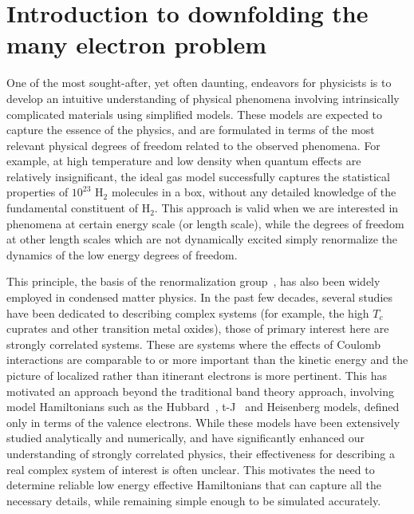 \section{Introduction to downfolding the many electron problem}

One of the most sought-after, yet often daunting, endeavors for physicists is to develop an intuitive understanding of physical phenomena involving intrinsically complicated materials using simplified models. 
These models are expected to capture the essence of the physics, and are formulated in terms of the most relevant physical degrees of freedom related to the observed phenomena. 
For example, at high temperature and low density when quantum effects are relatively insignificant, the ideal gas model successfully captures the statistical properties of $10^{23}$ H$_{2}$ molecules in a box, without any detailed knowledge of the fundamental constituent of H$_{2}$. 
This approach is valid when we are interested in phenomena at certain energy scale (or length scale), while the degrees of freedom at other length scales which are not  dynamically excited simply renormalize the dynamics of the low energy degrees of freedom. 

This principle, the basis of the renormalization group~\cite{Wilson}, has also been widely employed in condensed matter physics. 
In the past few decades, several studies have been dedicated to describing complex systems (for example, the high $T_c$ cuprates and other transition metal oxides), those of primary interest here are strongly correlated systems. 
These are systems where the effects of Coulomb interactions are comparable to or more important than the kinetic energy and the picture of localized rather than itinerant electrons is more pertinent. This has motivated an approach beyond the traditional band theory approach, involving model Hamiltonians such as the Hubbard~\cite{Hubbard}, t-J~\cite{tJSpalek} and Heisenberg models, defined only in terms of the valence electrons. 
While these models have been extensively studied analytically and numerically, and have significantly enhanced our understanding of strongly correlated physics, their effectiveness for describing a real complex system of interest is often unclear. 
This motivates the need to determine reliable low energy effective Hamiltonians that can capture all the necessary details, while remaining simple enough to be simulated accurately.  

